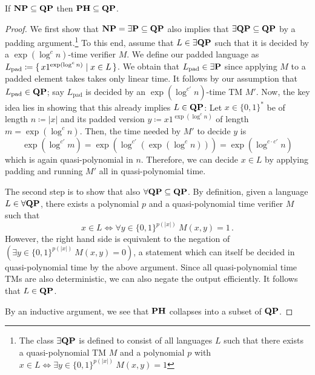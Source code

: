 \documentclass[12pt]{article}
\theoremstyle{definition}
\begin{document}
\newpage

\begin{lemma}
  \label{lem:ph-sub-qp}
  If $\NP \subseteq \class{QP}$ then
  $\class{PH} \subseteq \class{QP}$.
\end{lemma}

\begin{proof}
  We first show that $\NP = \exists \P \subseteq \class{QP}$ also implies that
  $\exists \class{QP} \subseteq \class{QP}$ by a padding
  argument.\footnote{The class $\exists \class{QP}$ is defined to consist of
  all languages $L$ such that there exists a quasi-polynomial TM $M$ and a
  polynomial $p$ with $x \in L \iff \exists y \in \{0,1\}^{p(|x|)}\
  M(x,y) = 1$}
  To this end, assume that $L \in \exists \class{QP}$ such that it is decided
  by a $\exp(\log^c n)$-time verifier $M$.
  We define our padded language as
  $L_{\textrm{pad}} \coloneqq \set{ x 1^{\exp(\log^c n)} \mid x \in L }$.
  We obtain that $L_{\textrm{pad}} \in \exists \P$ since applying $M$ to a
  padded element takes takes only linear time.
  It follows by our assumption that $L_{\textrm{pad}} \in \class{QP}$;
  say $L_{\textrm{pad}}$ is decided by an $\exp(\log^{c'} n)$-time TM $M'$.
  Now, the key idea lies in showing that this already implies
  $L \in \class{QP}$:
  Let $x \in \{0,1\}^*$ be of length $n \coloneqq |x|$ and
  its padded version $y \coloneqq x 1^{\exp(\log^c n)}$ of length
  $m = \exp(\log^c n)$. Then, the time needed by $M'$ to decide $y$ is
  \[
    \exp(\log^{c'} m)
    =
    \exp(\log^{c'}(\exp(\log^c n)))
    =
    \exp(\log^{c \cdot c'} n)
  \]
  which is again quasi-polynomial in $n$.
  Therefore, we can decide $x \in L$ by applying padding and running $M'$ all
  in quasi-polynomial time.

  The second step is to show that also
  $\forall \class{QP} \subseteq \class{QP}$.
  By definition, given a language $L \in \forall \class{QP}$, there exists a
  polynomial $p$ and a quasi-polynomial time verifier $M$ such that
  \[
    x \in L \iff \forall y \in \{0,1\}^{p(|x|)}\ M(x,y) = 1 \,.
  \]
  However, the right hand side is equivalent to the negation of
  $(\exists y \in \{0,1\}^{p(|x|)}\ M(x,y) = 0)$, a statement which can itself
  be decided in quasi-polynomial time by the above argument.
  Since all quasi-polynomial time TMs are also deterministic, we can also
  negate the output efficiently. It follows that $L \in \class{QP}$.

  By an inductive argument, we see that $\class{PH}$ collapses into a subset of
  $\class{QP}$.
\end{proof}
\end{document}
